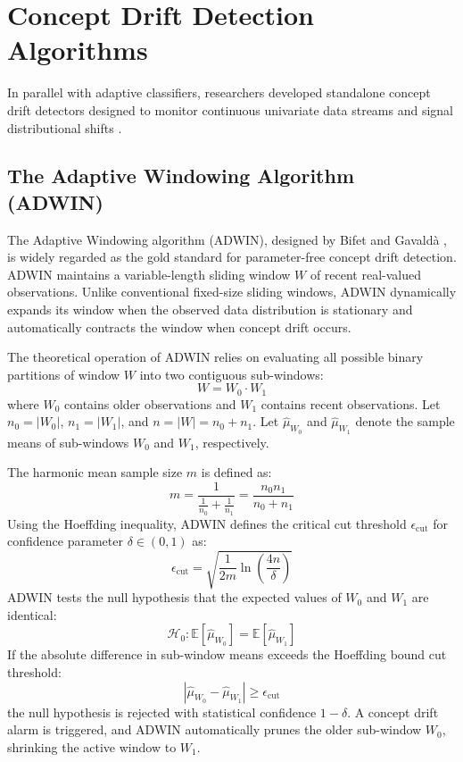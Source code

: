 \documentclass[12pt,a4paper,oneside]{report}
\begin{document}
\section{Concept Drift Detection Algorithms}
In parallel with adaptive classifiers, researchers developed standalone concept drift detectors designed to monitor continuous univariate data streams and signal distributional shifts \cite{ditzler2015}.

\subsection{The Adaptive Windowing Algorithm (ADWIN)}
The Adaptive Windowing algorithm (ADWIN), designed by Bifet and Gavald\`{a} \cite{bifet2007}, is widely regarded as the gold standard for parameter-free concept drift detection. ADWIN maintains a variable-length sliding window $W$ of recent real-valued observations. Unlike conventional fixed-size sliding windows, ADWIN dynamically expands its window when the observed data distribution is stationary and automatically contracts the window when concept drift occurs.

The theoretical operation of ADWIN relies on evaluating all possible binary partitions of window $W$ into two contiguous sub-windows:
\begin{equation}
W = W_0 \cdot W_1
\end{equation}
where $W_0$ contains older observations and $W_1$ contains recent observations. Let $n_0 = |W_0|$, $n_1 = |W_1|$, and $n = |W| = n_0 + n_1$. Let $\hat{\mu}_{W_0}$ and $\hat{\mu}_{W_1}$ denote the sample means of sub-windows $W_0$ and $W_1$, respectively.

The harmonic mean sample size $m$ is defined as:
\begin{equation}
m = \frac{1}{\frac{1}{n_0} + \frac{1}{n_1}} = \frac{n_0 n_1}{n_0 + n_1}
\end{equation}
Using the Hoeffding inequality, ADWIN defines the critical cut threshold $\epsilon_{\text{cut}}$ for confidence parameter $\delta \in (0, 1)$ as:
\begin{equation}
\epsilon_{\text{cut}} = \sqrt{\frac{1}{2m} \ln\left( \frac{4n}{\delta} \right)}
\end{equation}
ADWIN tests the null hypothesis that the expected values of $W_0$ and $W_1$ are identical:
\begin{equation}
\mathcal{H}_0: \mathbb{E}[\hat{\mu}_{W_0}] = \mathbb{E}[\hat{\mu}_{W_1}]
\end{equation}
If the absolute difference in sub-window means exceeds the Hoeffding bound cut threshold:
\begin{equation}
|\hat{\mu}_{W_0} - \hat{\mu}_{W_1}| \ge \epsilon_{\text{cut}}
\end{equation}
the null hypothesis is rejected with statistical confidence $1 - \delta$. A concept drift alarm is triggered, and ADWIN automatically prunes the older sub-window $W_0$, shrinking the active window to $W_1$.
\end{document}

